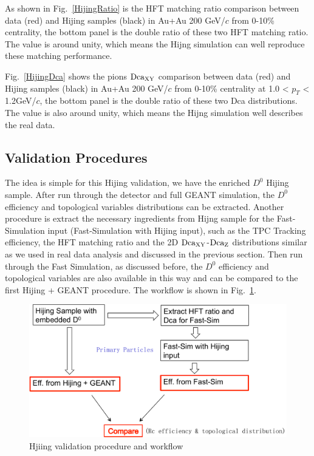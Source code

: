 As shown in Fig.~\ref{HijingRatio} is the HFT matching ratio comparison between data (red) and Hijing samples (black) in Au+Au 200 GeV/$c$ from 0-10\% centrality, the bottom panel is the double ratio of these two HFT matching ratio. The value is around unity, which means the Hijng simulation can well reproduce these matching performance. 

Fig.~\ref{HijingDca} shows the pions $\textup{Dca}_{\textup{XY}}$ comparison between data (red) and Hijing samples (black) in Au+Au 200 GeV/$c$ from 0-10\% centrality at 1.0 < $p_T$ < 1.2GeV/$c$, the bottom panel is the double ratio of these two Dca distributions. The value is also around unity, which means the Hijng simulation well describes the real data.

\subsection{Validation Procedures}
\label{validationprocedure}

The idea is simple for this Hijing validation, we have the enriched $D^0$ Hijing sample. After run through the detector and full GEANT simulation, the $D^0$ efficiency and topological variables distributions can be extracted. Another procedure is extract the necessary ingredients from Hijng sample for the Fast-Simulation input (Fast-Simulation with Hijing input), such as the TPC Tracking efficiency, the HFT matching ratio and the 2D $\textup{Dca}_\textup{XY}$-$\textup{Dca}_\textup{Z}$ distributions similar as we used in real data analysis and discussed in the previous section. Then run through the Fast Simulation, as discussed before, the $D^0$ efficiency and topological variables are also available in this way and can be compared to the first Hijing + GEANT procedure. The workflow is shown in Fig.~\ref{validation0}.

\begin{figure}[htbp]
\centering
\includegraphics[keepaspectratio,width=1.0\textwidth]{figure/Run14_D0HFT/validation0.pdf}
\caption{Hjiing validation procedure and workflow}
\label{validation0}
\end{figure}

